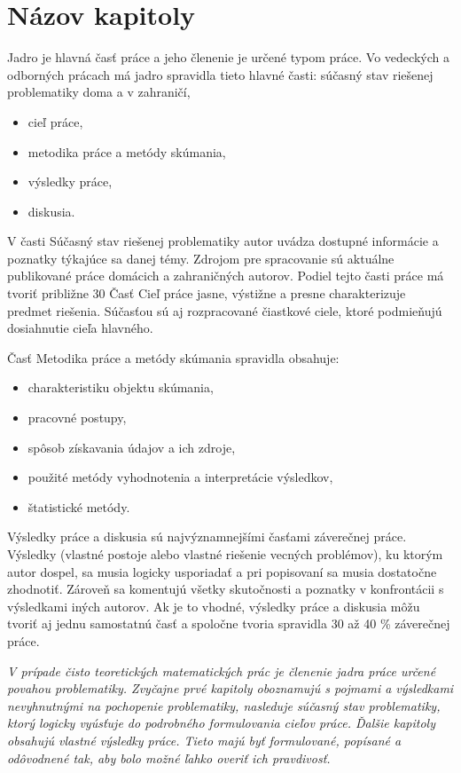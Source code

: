 \section{Názov kapitoly}
\label{Nazovkapitoly}

Jadro je hlavná časť práce a jeho členenie je určené typom práce. Vo vedeckých a odborných prácach  má jadro spravidla tieto hlavné časti:
súčasný stav riešenej problematiky doma a v zahraničí,
\begin{itemize}
	\item cieľ práce,
	\item metodika práce a metódy skúmania,
	\item výsledky práce,
	\item diskusia. 
\end{itemize}

 
V časti Súčasný stav riešenej problematiky autor uvádza dostupné informácie a poznatky týkajúce sa danej témy. Zdrojom pre spracovanie sú aktuálne publikované práce domácich a zahraničných autorov. Podiel tejto časti práce má tvoriť približne 30 %
Časť Cieľ práce jasne, výstižne a presne charakterizuje predmet riešenia. Súčasťou sú aj rozpracované čiastkové ciele, ktoré podmieňujú dosiahnutie cieľa hlavného. 

Časť Metodika práce a metódy skúmania spravidla obsahuje:
\begin{itemize}
	\item charakteristiku objektu skúmania,
	\item pracovné postupy, 
	\item spôsob získavania údajov a ich zdroje,
	\item použité metódy vyhodnotenia a interpretácie výsledkov,
	\item štatistické metódy. 
\end{itemize}

Výsledky práce a diskusia sú najvýznamnejšími časťami záverečnej práce. Výsledky (vlastné postoje alebo vlastné riešenie vecných problémov), ku ktorým autor dospel, sa musia logicky usporiadať a pri popisovaní sa musia dostatočne zhodnotiť. Zároveň sa komentujú všetky skutočnosti a poznatky v konfrontácii s výsledkami iných autorov. Ak je to vhodné, výsledky práce a diskusia môžu tvoriť aj jednu samostatnú časť a spoločne tvoria spravidla 30 až 40 \% záverečnej práce.

{\it V prípade čisto teoretických matematických prác je členenie jadra práce určené povahou problematiky. Zvyčajne prvé kapitoly oboznamujú s pojmami a výsledkami nevyhnutnými na pochopenie problematiky, nasleduje súčasný stav problematiky, ktorý logicky vyúsťuje do podrobného formulovania cieľov práce. Ďalšie kapitoly obsahujú vlastné výsledky práce.  Tieto majú byť formulované, popísané a odôvodnené tak, aby bolo možné ľahko overiť ich pravdivosť.}

